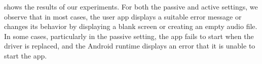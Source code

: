 shows the results of our experiments. For both the
passive and active settings, we observe that in most cases, the user app
displays a suitable error message or changes its behavior by displaying a blank
screen or creating an empty audio file. In some cases, particularly in the
passive setting, the app fails to start when the driver is replaced, and the
Android runtime displays an error that it is unable to start the app.

